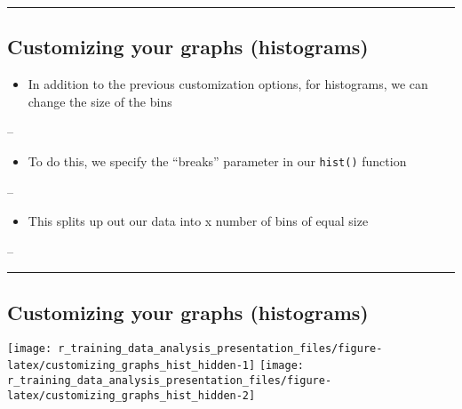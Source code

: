 \documentclass[]{article}
\newenvironment{Shaded}{\begin{snugshade}}{\end{snugshade}}
\newcommand{\DataTypeTok}[1]{\textcolor[rgb]{0.13,0.29,0.53}{#1}}
\newcommand{\DecValTok}[1]{\textcolor[rgb]{0.00,0.00,0.81}{#1}}
\newcommand{\KeywordTok}[1]{\textcolor[rgb]{0.13,0.29,0.53}{\textbf{#1}}}
\newcommand{\NormalTok}[1]{#1}
\newcommand{\OperatorTok}[1]{\textcolor[rgb]{0.81,0.36,0.00}{\textbf{#1}}}
\providecommand{\tightlist}{%
  \setlength{\itemsep}{0pt}\setlength{\parskip}{0pt}}
\begin{document}
\begin{center}\rule{0.5\linewidth}{\linethickness}\end{center}

\hypertarget{customizing-your-graphs-histograms}{%
\subsection{Customizing your graphs
(histograms)}\label{customizing-your-graphs-histograms}}

\begin{itemize}
\tightlist
\item
  In addition to the previous customization options, for histograms, we
  can change the size of the bins
\end{itemize}

--

\begin{itemize}
\tightlist
\item
  To do this, we specify the ``breaks'' parameter in our \texttt{hist()}
  function
\end{itemize}

--

\begin{itemize}
\tightlist
\item
  This splits up out our data into x number of bins of equal size
\end{itemize}

--

\begin{Shaded}
\end{Shaded}

\begin{center}\rule{0.5\linewidth}{\linethickness}\end{center}

\hypertarget{customizing-your-graphs-histograms-1}{%
\subsection{Customizing your graphs
(histograms)}\label{customizing-your-graphs-histograms-1}}

\texttt{[image: r\_training\_data\_analysis\_presentation\_files/figure-latex/customizing\_graphs\_hist\_hidden-1]}
\texttt{[image: r\_training\_data\_analysis\_presentation\_files/figure-latex/customizing\_graphs\_hist\_hidden-2]}
\end{document}
